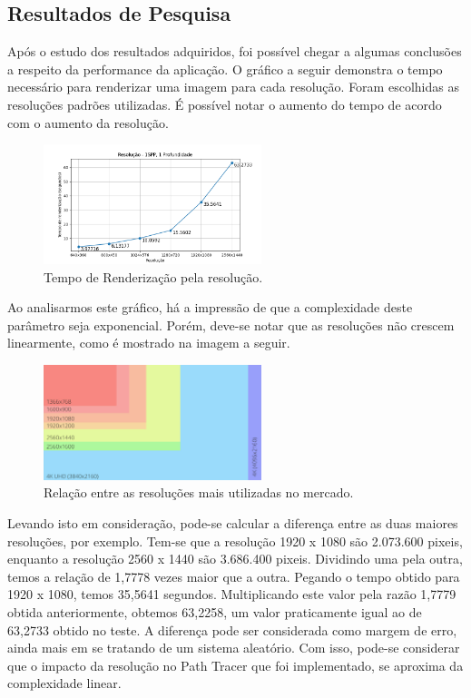 \documentclass[journal]{IEEEtran}
\begin{document}
\subsection{Resultados de Pesquisa}
Após o estudo dos resultados adquiridos, foi possível chegar a algumas conclusões a respeito
da performance da aplicação. O gráfico a seguir demonstra o tempo necessário para renderizar
uma imagem para cada resolução. Foram escolhidas as resoluções padrões utilizadas. É possível
notar o aumento do tempo de acordo com o aumento da resolução. 

\begin{figure}[ht]
  \centering
  \includegraphics[width=2.5in]{media/Desktop_RES.png}
  \caption{Tempo de Renderização pela resolução.}
  \label{img_desktop_res}
\end{figure}

Ao analisarmos este gráfico, há a impressão de que a complexidade deste parâmetro seja exponencial.
Porém, deve-se notar que as resoluções não crescem linearmente, como é mostrado na imagem a seguir.

\begin{figure}[ht]
  \centering
  \includegraphics[width=2.5in]{media/resolutions.png}
  \caption{Relação entre as resoluções mais utilizadas no mercado.}
  \label{img_resolutions}
\end{figure}

Levando isto em consideração, pode-se calcular a diferença entre as duas maiores resoluções, por exemplo.
Tem-se que a resolução 1920 x 1080 são 2.073.600 pixeis, enquanto a resolução 2560 x 1440 são 3.686.400
pixeis. Dividindo uma pela outra, temos a relação de 1,7778 vezes maior que a outra. Pegando o tempo
obtido para 1920 x 1080, temos 35,5641 segundos. Multiplicando este valor pela razão 1,7779 obtida 
anteriormente, obtemos 63,2258, um valor praticamente igual ao de 63,2733 obtido no teste. A diferença pode
ser considerada como margem de erro, ainda mais em se tratando de um sistema aleatório. Com isso, pode-se
considerar que o impacto da resolução no Path Tracer que foi implementado, se aproxima da complexidade
linear.
\end{document}
